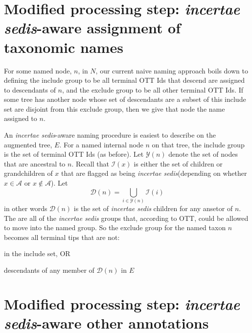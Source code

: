 \documentclass[11pt]{article}
\newcommand{\insed}{{\em incertae sedis}\xspace}
\newcommand{\naiveFullTree}{\ensuremath{N}\xspace}
\newcommand{\augmentedFullTree}{\ensuremath{E}\xspace}
\newcommand{\insedChildren}[1]{\ensuremath{\mathcal{I}(#1)}\xspace}
\begin{document}
\section{Modified processing step: \insed-aware assignment of taxonomic names}
For some named node, $n$, in \naiveFullTree, our current naive naming approach
    boils down to defining the include group to be all terminal OTT Ids that descend are assigned to descendants of $n$, and 
    the exclude group to be all other terminal OTT Ids.
If some tree has another node whose set of descendants are a subset of this include
    set are disjoint from this exclude group, then we give that node the name assigned to $n$.

An \insed-aware naming procedure is easiest to describe on the augmented tree, \augmentedFullTree.
For a named internal node $n$ on that tree, the include group is the set of terminal 
    OTT Ids (as before).
Let $\mathcal{Y}(n)$ denote the set of nodes that are ancestral to $n$.
Recall that $\insedChildren{x}$ is either the set of children or grandchildren of $x$ that 
    are flagged as being \insed (depending on whether $x\in\mathcal{A}$ or $x\notin\mathcal{A}$).
Let $$\mathcal{D}(n) =\bigcup_{i\in\mathcal{Y}(n)}\insedChildren{i}$$
in other words $\mathcal{D}(n)$ is the set of \insed children for any ansetor of $n$.
The are all of the \insed groups that, according to OTT, could be allowed to move into the named
    group.
So the exclude group for the named taxon $n$ becomes all terminal tips that are not:
\begin{compactitem}
    \item in the include set, OR
    \item descendants of any member of $\mathcal{D}(n)$ in \augmentedFullTree
\end{compactitem}
\section{Modified processing step: \insed-aware other annotations}

\end{document}
